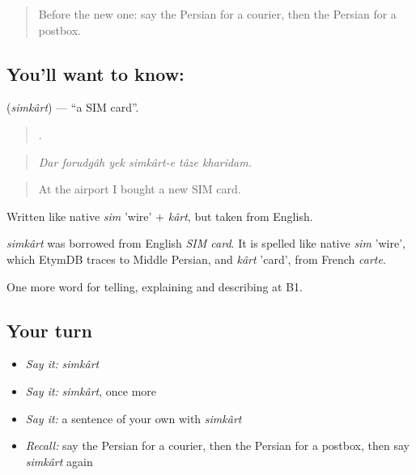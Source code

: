 \label{lesson:FA-C456-simkart}



\begin{quote}
Before the new one: say the Persian for a courier, then the Persian for a postbox.
\end{quote}

\subsection*{You'll want to know:  }
\textbf{ } (\emph{simkârt}) — \textquotedblleft{}a SIM card\textquotedblright{}.

\begin{quote}
      .
\end{quote}

\begin{quote}
\emph{Dar forudgâh yek simkârt-e tâze kharidam.}
\end{quote}

\begin{quote}
At the airport I bought a new SIM card.
\end{quote}

Written like native \emph{sim} 'wire' + \emph{kârt}, but taken from English.

\begin{cousinweb}
\emph{simkârt} was borrowed from English \emph{SIM card}. It is spelled like native \emph{sim} 'wire', which EtymDB traces to Middle Persian, and \emph{kârt} 'card', from French \emph{carte}.
\end{cousinweb}

\begin{grammarlens}[title={What you've built}]
One more word for telling, explaining and describing at B1.
\end{grammarlens}

\subsection*{Your turn}
\begin{itemize}
\raggedright
  \item \emph{Say it:} \emph{simkârt}
  \item \emph{Say it:} \emph{simkârt}, once more
  \item \emph{Say it:} a sentence of your own with \emph{simkârt}
  \item \emph{Recall:} say the Persian for a courier, then the Persian for a postbox, then say \emph{simkârt} again
\end{itemize}

